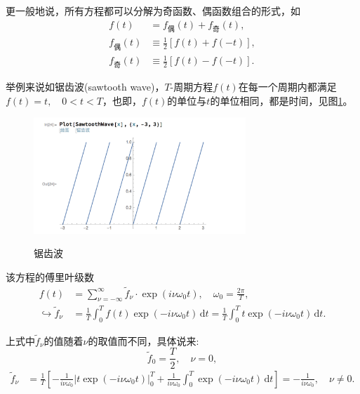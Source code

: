 更一般地说，所有方程都可以分解为奇函数、偶函数组合的形式，如
\begin{equation*}
  \begin{split}
    f(t) & = f_{\text{偶}}(t) + f_{\text{奇}}(t), \\
    f_{\text{偶}}(t) & \equiv \frac{1}{2} \left[ f(t) + f(-t) \right], \\
    f_{\text{奇}}(t) & \equiv \frac{1}{2} \left[ f(t) - f(-t) \right].
  \end{split}
\end{equation*}

举例来说如锯齿波(sawtooth wave)，$T$-周期方程$f(t)$在每一个周期内都满足$f(t) = t, \quad 0 < t < T$，也即，$f(t)$的单位与$t$的单位相同，都是时间，见图\ref{fig:fourier-series-sawwave}。
\begin{figure}[htbp]
   \caption{锯齿波}
  \centering
  \includegraphics[width=8cm]{./Figures/20180305-sawtooth-wave.png}
  \label{fig:fourier-series-sawwave}
%
\end{figure}

该方程的傅里叶级数
\begin{equation*}
  \begin{split}
    f(t) & = \sum_{\nu = - \infty}^{\infty} \tilde{f}_{\nu} \cdot \exp \left( i \nu \omega_{0} t \right), \quad \omega_{0} = \frac{2 \pi}{T}, \\
    \hookrightarrow \tilde{f}_{\nu} & = \frac{1}{T} \int_{0}^{T} f(t) \exp \left( - i \nu \omega_{0} t \right) \, \mathrm{d} t = \frac{1}{T} \int_{0}^{T} t \exp \left( - i \nu \omega_{0} t  \right) \, \mathrm{d} t.
  \end{split}
\end{equation*}

上式中$\tilde{f}_{\nu}$的值随着$\nu$的取值而不同，具体说来:
\begin{equation*}
  \tilde{f}_{0} = \frac{T}{2}, \quad \nu = 0,
\end{equation*}
\begin{equation*}
  \begin{split}
    \tilde{f}_{\nu} & = \frac{1}{T}
    \left[
    - \frac{1}{ i \nu \omega_{0}}
    \left| t \exp \left( - i \nu \omega_{0} t \right) \right|_{0}^{T}
    + \frac{1}{ i \nu \omega_{0}}
    \int_{0}^{T} \exp \left( - i \nu \omega_{0} t \right) \, \mathrm{d} t
    \right]  = - \frac{1}{i \nu \omega_{0}}, \quad \nu \neq 0.
  \end{split}
\end{equation*}

